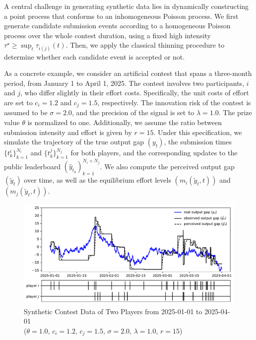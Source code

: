 \documentclass[mnsc]{informs3}
\begin{document}
A central challenge in generating synthetic data lies in dynamically constructing a point process that conforms to an inhomogeneous Poisson process.
We first generate candidate submission events according to a homogeneous Poisson process over the whole contest duration, using a fixed high intensity $\tau^\star \ge \sup_t \tau_{i(j)}(t)$.
Then, we apply the classical thinning procedure \citep{lewis1979simulation} to determine whether each candidate event is accepted or not.

As a concrete example, we consider an artificial contest that spans a three-month period, from January 1 to April 1, 2025.
The contest involves two participants, $i$ and $j$, who differ slightly in their effort costs.
Specifically, the unit costs of effort are set to $c_i = 1.2$ and $c_j = 1.5$, respectively. 
The innovation risk of the contest is assumed to be $\sigma = 2.0$, and the precision of the signal is set to $\lambda = 1.0$. 
The prize value $\theta$ is normalized to one. 
Additionally, we assume the ratio between submission intensity and effort is given by $r = 15$. 
Under this specification, we simulate the trajectory of the true output gap $(y_t)$, the submission times $\{t^i_k\}_{k=1}^{N_i}$ and $\{t^j_k\}_{k=1}^{N_j}$ for both players, and the corresponding updates to the public leaderboard $(\hat{y}_{t_k})_{k=1}^{N_i + N_j}$. 
We also compute the perceived output gap $(\tilde{y}_t)$ over time, as well as the equilibrium effort levels $(m_i(\tilde{y}_t, t))$ and $(m_j(\tilde{y}_t, t))$. 

\begin{figure}[!ht]
	\noindent\includegraphics[scale=0.75]{synthetic_data.pdf}
	\caption{Synthetic Contest Data of Two Players from 2025-01-01 to 2025-04-01\\($\theta = 1.0$, $c_i = 1.2$, $c_j = 1.5$, $\sigma = 2.0$, $\lambda = 1.0$, $r = 15$)}
	\label{fig-synthetic_90}
\end{figure}
\end{document}
